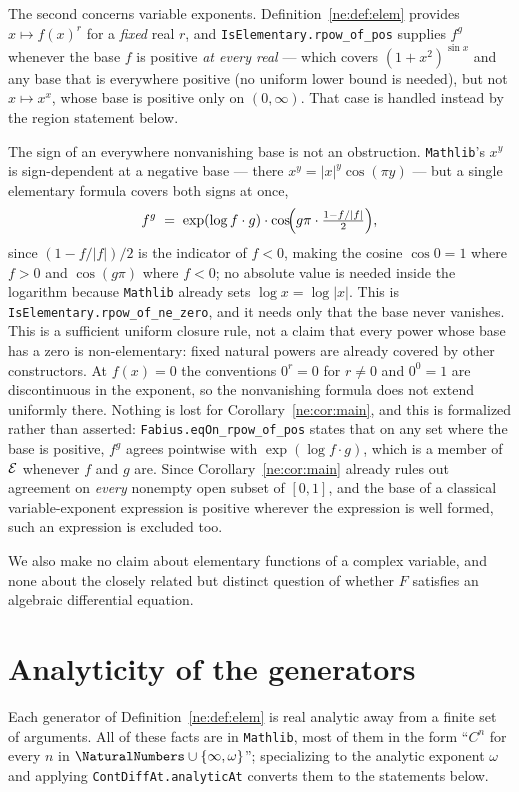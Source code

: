 The second concerns variable exponents.  Definition~\ref{ne:def:elem}
provides $x\mapsto f(x)^r$ for a \emph{fixed} real $r$, and
\texttt{IsElementary.rpow\_of\_pos} supplies $f^g$ whenever the base $f$ is
positive \emph{at every real} --- which covers $(1+x^2)^{\sin x}$ and any base
that is everywhere positive (no uniform lower bound is needed), but not
$x\mapsto x^x$, whose base is positive only on $(0,\infty)$.  That case is
handled instead by the region statement below.

The sign of an everywhere nonvanishing base is not an obstruction.
\texttt{Mathlib}'s $x^y$ is sign-dependent at a
negative base --- there $x^y=|x|^y\cos(\pi y)$ --- but a single elementary
formula covers both signs at once,
\[
  f^{g}\;=\;\exp(\log f\cdot g)\cdot
           \cos\!\Bigl(g\pi\cdot\tfrac{1-f/|f|}{2}\Bigr),
\]
since $(1-f/|f|)/2$ is the indicator of $f<0$, making the cosine $\cos 0=1$
where $f>0$ and $\cos(g\pi)$ where $f<0$; no absolute value is needed inside
the logarithm because \texttt{Mathlib} already sets $\log x=\log|x|$.  This is
\texttt{IsElementary.rpow\_of\_ne\_zero}, and it needs only that the base never
vanishes.  This is a sufficient uniform closure rule, not a claim that every
power whose base has a zero is non-elementary: fixed natural powers are
already covered by other constructors.  At
$f(x)=0$ the conventions $0^r=0$ for $r\ne0$ and $0^0=1$ are discontinuous in
the exponent, so the nonvanishing formula does not extend uniformly there.
Nothing is lost for Corollary~\ref{ne:cor:main}, and this is
formalized rather than asserted: \texttt{Fabius.eqOn\_rpow\_of\_pos}
states that on any set where the base is positive, $f^{g}$ agrees pointwise
with $\exp(\log f\cdot g)$, which is a member of $\mathcal E$ whenever $f$ and $g$
are.  Since Corollary~\ref{ne:cor:main} already rules out agreement on \emph{every}
nonempty open subset of $[0,1]$, and the base of a classical
variable-exponent expression is positive wherever the expression is well
formed, such an expression is excluded too.

We also make no claim about elementary functions of a complex variable, and
none about the closely related but distinct question of whether $F$ satisfies
an algebraic differential equation.

\section{Analyticity of the generators}

Each generator of Definition~\ref{ne:def:elem} is real analytic away from a finite set of
arguments.  All of these facts are in \texttt{Mathlib}, most of them in the
form ``$C^n$ for every $n$ in $\NaturalNumbers\cup\{\infty,\omega\}$''; specializing to the
analytic exponent $\omega$ and applying \texttt{ContDiffAt.analyticAt}
converts them to the statements below.

